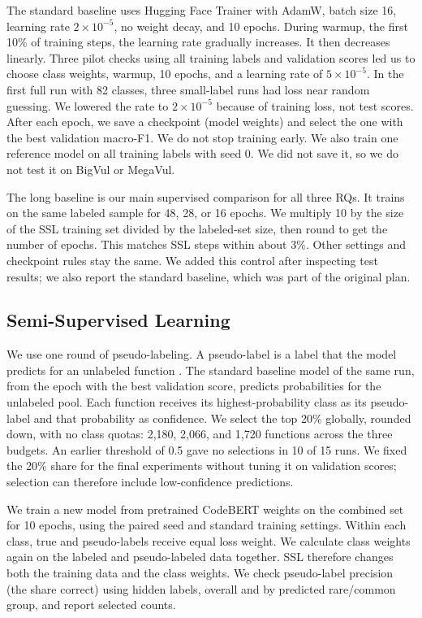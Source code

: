 \documentclass[conference]{IEEEtran}
\begin{document}
The standard baseline uses Hugging Face Trainer with AdamW, batch size
16, learning rate \(2\times10^{-5}\), no weight decay, and 10 epochs.
During warmup, the first 10\% of training steps, the learning rate
gradually increases. It then decreases linearly. Three pilot checks
using all training labels and validation scores led us to choose class
weights, warmup, 10 epochs, and a learning rate of \(5\times10^{-5}\).
In the first full run with 82 classes, three small-label runs had loss
near random guessing. We lowered the rate to \(2\times10^{-5}\) because
of training loss, not test scores. After each epoch, we save a
checkpoint (model weights) and select the one with the best validation
macro-F1. We do not stop training early. We also train one reference
model on all training labels with seed 0. We did not save it, so we do
not test it on BigVul or MegaVul.

The long baseline is our main supervised comparison for all three RQs.
It trains on the same labeled sample for 48, 28, or 16 epochs. We
multiply 10 by the size of the SSL training set divided by the
labeled-set size, then round to get the number of epochs. This matches
SSL steps within about 3\%. Other settings and checkpoint rules stay the
same. We added this control after inspecting test results; we also
report the standard baseline, which was part of the original plan.

\subsection{Semi-Supervised Learning}\label{semi-supervised-learning}

We use one round of pseudo-labeling. A pseudo-label is a label that the
model predicts for an unlabeled function \cite{lee2013pseudo}. The
standard baseline model of the same run, from the epoch with the best
validation score, predicts probabilities for the unlabeled pool. Each
function receives its highest-probability class as its pseudo-label and
that probability as confidence. We select the top 20\% globally, rounded
down, with no class quotas: 2,180, 2,066, and 1,720 functions across the
three budgets. An earlier threshold of 0.5 gave no selections in 10 of
15 runs. We fixed the 20\% share for the final experiments without
tuning it on validation scores; selection can therefore include
low-confidence predictions.

We train a new model from pretrained CodeBERT weights on the combined
set for 10 epochs, using the paired seed and standard training settings.
Within each class, true and pseudo-labels receive equal loss weight. We
calculate class weights again on the labeled and pseudo-labeled data
together. SSL therefore changes both the training data and the class
weights. We check pseudo-label precision (the share correct) using
hidden labels, overall and by predicted rare/common group, and report
selected counts.
\end{document}
